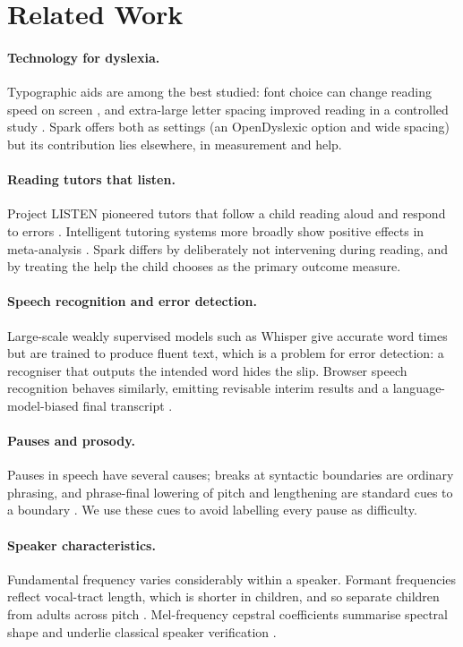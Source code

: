 \documentclass[manuscript, screen, review, anonymous]{acmart}
\begin{document}
\section{Related Work}
\paragraph{Technology for dyslexia.} Typographic aids are among the best studied: font choice can change reading speed on screen \cite{rello2016font}, and extra-large letter spacing improved reading in a controlled study \cite{zorzi2012spacing}. Spark offers both as settings (an OpenDyslexic option and wide spacing) but its contribution lies elsewhere, in measurement and help.

\paragraph{Reading tutors that listen.} Project LISTEN pioneered tutors that follow a child reading aloud and respond to errors \cite{mostow2001listen}. Intelligent tutoring systems more broadly show positive effects in meta-analysis \cite{kulik2016its}. Spark differs by deliberately not intervening during reading, and by treating the help the child chooses as the primary outcome measure.

\paragraph{Speech recognition and error detection.} Large-scale weakly supervised models such as Whisper \cite{radford2023whisper} give accurate word times but are trained to produce fluent text, which is a problem for error detection: a recogniser that outputs the intended word hides the slip. Browser speech recognition behaves similarly, emitting revisable interim results and a language-model-biased final transcript \cite{w3cspeech}.

\paragraph{Pauses and prosody.} Pauses in speech have several causes; breaks at syntactic boundaries are ordinary phrasing, and phrase-final lowering of pitch and lengthening are standard cues to a boundary \cite{wightman1992,heldner2010}. We use these cues to avoid labelling every pause as difficulty.

\paragraph{Speaker characteristics.} Fundamental frequency varies considerably within a speaker. Formant frequencies reflect vocal-tract length, which is shorter in children, and so separate children from adults across pitch \cite{peterson1952,vorperian2007}. Mel-frequency cepstral coefficients summarise spectral shape and underlie classical speaker verification \cite{davis1980}.
\end{document}
